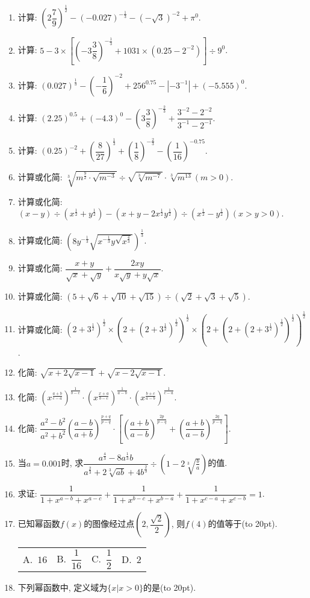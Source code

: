\documentclass[10pt,a4paper]{article}
\newcommand{\bracket}[1]{(\hbox to #1pt{})}
\newcommand{\fourch}[4]{\par\begin{tabular}{p{.23\textwidth}p{.23\textwidth}p{.23\textwidth}p{.23\textwidth}}
A.~#1 &B.~#2& C.~#3& D.~#4
\end{tabular}}
\begin{document}
\begin{enumerate}[1.]
\item 计算: $(2\dfrac 79)^{\frac 12}-(-0.027)^{-\frac 13}-(-\sqrt 3)^{-2}+\pi ^0$.
\item 计算: $5-3\times [ (-3\dfrac 38)^{-\frac 13}+1031\times (0.25-2^{-2}) ]\div 9^0$.
\item 计算: $(0.027)^{\frac 13}-(-\dfrac 16)^{-2}+256^{0.75}-|-3^{-1}|+(-5.555)^0$.
\item 计算: $(2.25)^{0.5}+(-4.3)^0-(3\dfrac 38)^{-\frac 23}+\dfrac{3^{-2}-2^{-2}}{3^{-1}-2^{-1}}$.
\item 计算: $(0.25)^{-2}+(\dfrac 8{27})^{\frac 13}+(\dfrac 18)^{-\frac 23}-(\dfrac 1{16})^{-0.75}$.
\item 计算或化简: $\sqrt [3]{m^{\frac 92}\cdot \sqrt {m^{-3}}}\div \sqrt {\sqrt [3]{m^{-7}}}\cdot \sqrt [3]{m^{13}}(m>0)$.
\item 计算或化简: $(x-y)\div (x^{\frac 12}+y^{\frac 12})-(x+y-2x^{\frac 12}y^{\frac 12})\div (x^{\frac 12}-y^{\frac 12})(x>y>0)$.
\item 计算或化简: $(8y^{-\frac 13}\sqrt {x^{-\frac 13}y\sqrt {x^{\frac 43}}})^{\frac 13}$.
\item 计算或化简: $\dfrac{x+y}{\sqrt x+\sqrt y}+\dfrac{2xy}{x\sqrt y+y\sqrt x}$.
\item 计算或化简: $(5+\sqrt 6+\sqrt {10}+\sqrt {15})\div (\sqrt 2+\sqrt 3+\sqrt 5)$.
\item 计算或化简: $(2+3^\frac 12)^\frac 12\times (2+(2+3^\frac 12)^\frac 12)^\frac 12\times (2+(2+(2+3^\frac 12)^\frac 12)^\frac 12)^\frac 12$.
\item 化简: $\sqrt {x+2\sqrt {x-1}}+\sqrt {x-2\sqrt {x-1}}$.
\item 化简: $(x^{\frac{a+b}{c-a}})^{\frac 1{b-c}}\cdot (x^{\frac{x+a}{b-c}})^{\frac 1{a-b}}\cdot (x^{\frac{b+c}{a-b}})^{\frac 1{c-a}}$.
\item 化简: $\dfrac{a^2-b^2}{a^2+b^2}(\dfrac{a-b}{a+b})^{\frac{p+q}{p-q}}\cdot [(\dfrac{a+b}{a-b})^{\frac{2p}{p-q}}+(\dfrac{a+b}{a-b})^{\frac{2q}{p-q}}]$.
\item 当$a=0.001$时, 求$\dfrac{a^{\frac 43}-8a^{\frac 13}b}{a^{\frac 23}+2\sqrt [3]{ab}+4b^{\frac 23}}\div (1-2\sqrt [3]{\frac ba})$的值.
\item 求证: $\dfrac 1{1+x^{a-b}+x^{a-c}}+\dfrac 1{1+x^{b-c}+x^{b-a}}+\dfrac 1{1+x^{c-a}+x^{c-b}}=1$.
\item 已知幂函数$f(x)$的图像经过点$(2,\dfrac{\sqrt 2}2)$, 则$f(4)$的值等于\bracket{20}.
\fourch{$16$}{$\dfrac 1{16}$}{$\dfrac 12$}{$2$}
\item 下列幂函数中, 定义域为$\{x|x>0\}$的是\bracket{20}.

\end{enumerate}
\end{document}
